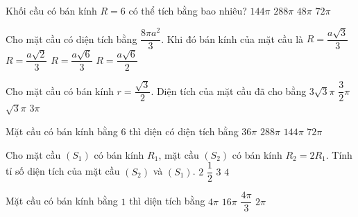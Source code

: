 	\begin{ex}%
	Khối cầu có bán kính $R=6$ có thể tích bằng bao nhiêu?
	\choice
	{$144\pi$}
	{\True $288\pi$}
	{$48\pi $}
	{$72\pi $}
	\end{ex}
	\begin{ex}%
	Cho mặt cầu có diện tích bằng $\dfrac{8\pi a^2}{3}$. Khi đó bán kính của mặt cầu là
	\choice
	{$R=\dfrac{a\sqrt{3}}{3}$}
	{$R=\dfrac{a\sqrt{2}}{3}$}
	{\True $R=\dfrac{a\sqrt{6}}{3}$}
	{$R=\dfrac{a\sqrt{6}}{2}$}
	\end{ex}
	\begin{ex}%
	Cho mặt cầu có bán kính $r=\dfrac{\sqrt{3}}{2}$. Diện tích của mặt cầu đã cho bằng
	\choice
	{$3\sqrt{3}\pi$}
	{$\dfrac{3}{2}\pi$}
	{$\sqrt{3}\pi$}
	{\True $3\pi $}
	\end{ex}
	\begin{ex}%
	Mặt cầu có bán kính bằng $6$ thì diện có diện tích bằng
	\choice
	{$36\pi $}
	{$288\pi$}
	{\True $144\pi$}
	{$72\pi $}
	\end{ex}
	\begin{ex}%
	Cho mặt cầu $(S_1)$ có bán kính $R_1$, mặt cầu $(S_2)$ có bán kính $R_2=2R_1$. Tính tỉ số diện tích của mặt cầu $(S_2)$ và $(S_1)$.
	\choice
	{$2$}
	{$\dfrac{1}{2}$}
	{$3$}
	{\True $4$}
	\end{ex}
	\begin{ex}%
	Mặt cầu có bán kính bằng $1$ thì diện tích bằng
	\choice
	{\True $4\pi $}
	{$16\pi $}
	{$\dfrac{4\pi}{3}$}
	{$2\pi $}
	\end{ex}
